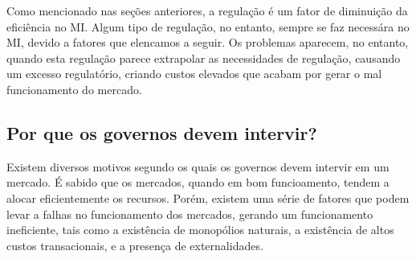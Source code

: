 \documentclass[
	12pt,				%
	oneside,			%
	a4paper,			%
	chapter=TITLE,		%
	section=TITLE,		%
	english,			%
	brazil				%
	]{abntex2}
\begin{document}
\begin{refsection}
Como mencionado nas seções anteriores, a regulação é um fator de diminuição da
eficiência no \gls{MI}. Algum tipo de regulação, no entanto, sempre se faz
necessára no \gls{MI}, devido a fatores que elencamos a seguir. Os problemas
aparecem, no entanto, quando esta regulação parece extrapolar as necessidades
de regulação, causando um excesso regulatório, criando custos elevados que
acabam por gerar o mal funcionamento do mercado.

\hypertarget{por-que-os-governos-devem-intervir}{%
\subsection{Por que os governos devem intervir?}\label{por-que-os-governos-devem-intervir}}

Existem diversos motivos segundo os quais os governos devem intervir em um
mercado. É sabido que os mercados, quando em bom funcioamento, tendem a alocar
eficientemente os recursos. Porém, existem uma série de fatores que podem levar
a falhas no funcionamento dos mercados, gerando um funcionamento ineficiente,
tais como a existência de monopólios naturais, a existência de altos custos
transacionais, e a presença de externalidades.


\end{refsection}
\end{document}
